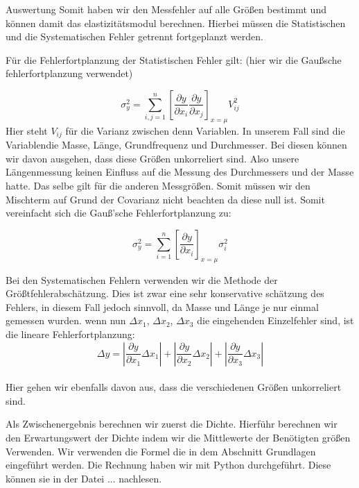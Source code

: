 \documentclass[twoside]{protokoll}
\begin{document}
\begin{aufgabe}{Auswertung}
Somit haben wir den Messfehler auf alle Größen bestimmt und können damit das elastizitätsmodul berechnen. Hierbei müssen die Statistischen und die Systematischen Fehler getrennt fortgeplanzt werden.

Für die Fehlerfortplanzung der Statistischen Fehler gilt: (hier wir die Gaußsche fehlerfortplanzung verwendet) 

\begin{equation}
	\sigma_y^2 = \sum_{i,j=1}^n\left[\frac{\partial y}{\partial x_i}\frac{\partial y}{\partial x_j}\right]_{x=\mu}V_{ij}^2
\end{equation}
Hier steht $V_{ij}$ für die Varianz zwischen denn Variablen. In unserem Fall sind die Variablendie Masse, Länge, Grundfrequenz und Durchmesser. 
Bei diesen können wir davon ausgehen, dass diese Größen unkorreliert sind. 
Also unsere Längenmessung keinen Einfluss auf die Messung des Durchmessers und der Masse hatte.
Das selbe gilt für die anderen Messgrößen. 
Somit müssen wir den Mischterm auf Grund der Covarianz nicht beachten da diese null ist.
Somit vereinfacht sich die Gauß'sche Fehlerfortplanzung zu:

\begin{equation}
	\sigma_y^2 = \sum_{i=1}^n\left[\frac{\partial y}{\partial x_i}\right]_{x=\mu}\sigma_{i}^2
\end{equation}

Bei den Systematischen Fehlern verwenden wir die Methode der Größtfehlerabschätzung. 
Dies ist zwar eine sehr konservative schätzung des Fehlers, in diesem Fall jedoch sinnvoll,
da Masse und Länge je nur einmal gemessen wurden. wenn nun $\Delta x_1$, $\Delta x_2$, $\Delta x_3$
die eingehenden Einzelfehler sind, ist die lineare Fehlerfortplanzung: \\

\begin{equation}
	\Delta y = \left|\frac{\partial y}{\partial x_1}\Delta x_1\right| + 
	\left|\frac{\partial y}{\partial x_2}\Delta x_2\right| + 
	\left|\frac{\partial y}{\partial x_3}\Delta x_3\right|
\end{equation}\\

Hier gehen wir ebenfalls davon aus, dass die verschiedenen Größen unkorreliert sind. 

Als Zwischenergebnis berechnen wir zuerst die Dichte. Hierführ berechnen wir den
Erwartungswert der Dichte indem wir die Mittlewerte der Benötigten größen Verwenden. 
Wir verwenden die Formel die in dem Abschnitt Grundlagen eingeführt werden. Die Rechnung haben wir mit Python durchgeführt. Diese können sie in der Datei ... nachlesen.\\


\end{aufgabe}
\end{document}
